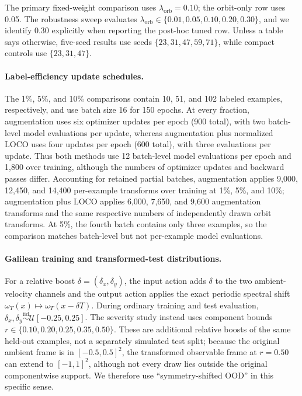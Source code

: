 The primary fixed-weight comparison uses \(\lambda_{\mathrm{orb}}=0.10\); the
orbit-only row uses 0.05.  The robustness sweep evaluates
\(\lambda_{\mathrm{orb}}\in\{0.01,0.05,0.10,0.20,0.30\}\), and we identify 0.30
explicitly when reporting the post-hoc tuned row.  Unless a table says otherwise,
five-seed results use seeds \(\{23,31,47,59,71\}\), while compact controls use
\(\{23,31,47\}\).

\paragraph{Label-efficiency update schedules.}
The 1\%, 5\%, and 10\% comparisons contain 10, 51, and 102 labeled examples,
respectively, and use batch size 16 for 150 epochs.  At every fraction,
augmentation uses six optimizer updates per epoch (900 total), with two
batch-level model evaluations per update, whereas augmentation plus normalized
LOCO uses four updates per epoch (600 total), with three evaluations per update.
Thus both methods use 12 batch-level model evaluations per epoch and 1,800 over
training, although the numbers of optimizer updates and backward passes differ.
Accounting for retained partial batches, augmentation applies 9,000, 12,450, and
14,400 per-example transforms over training at 1\%, 5\%, and 10\%; augmentation
plus LOCO applies 6,000, 7,650, and 9,600 augmentation transforms and the same
respective numbers of independently drawn orbit transforms.  At 5\%, the fourth
batch contains only three examples, so the comparison matches batch-level but not
per-example model evaluations.

\paragraph{Galilean training and transformed-test distributions.}
For a relative boost \(\delta=(\delta_x,\delta_y)\), the input action adds
\(\delta\) to the two ambient-velocity channels and the output action applies the
exact periodic spectral shift \(\omega_T(x)\mapsto\omega_T(x-\delta T)\).
During ordinary training and test evaluation,
\(\delta_x,\delta_y\stackrel{\mathrm{iid}}{\sim}\mathcal U[-0.25,0.25]\).
The severity study instead uses component bounds
\(r\in\{0.10,0.20,0.25,0.35,0.50\}\).  These are additional relative boosts of
the same held-out examples, not a separately simulated test split; because the
original ambient frame is in \([-0.5,0.5]^2\), the transformed observable frame at
\(r=0.50\) can extend to \([-1,1]^2\), although not every draw lies outside the
original componentwise support.  We therefore use ``symmetry-shifted OOD'' in this
specific sense.

